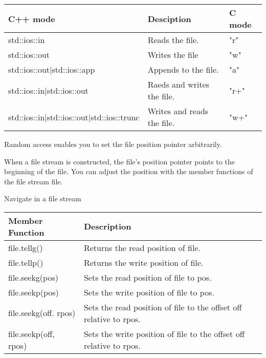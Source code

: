 \begin{longtable}[c]{|l|l|l|}
\hline
\textbf{C++ mode}                          & \textbf{Desciption}        & \textbf{C mode} \\ \hline
\endfirsthead
%
\endhead
%
std::ios::in                               & Reads the file.            & "r"             \\ \hline
std::ios::out                              & Writes the file            & "w"             \\ \hline
std::ios::out|std::ios::app                & Appends to the file.       & "a"             \\ \hline
std::ios::in|std::ios::out                 & Raeds and writes the file. & "r+"            \\ \hline
std::ios::in|std::ios::out|std::ios::trunc & Writes and reads the file. & "w+"            \\ \hline
\end{longtable}


Random access enables you to set the file position pointer arbitrarily.

When a file stream is constructed, the file’s position pointer points to the beginning of the file. You can adjust the position with the member functions of the file stream file.

\begin{center}
Navigate in a file stream
\end{center}

\begin{longtable}[c]{|l|l|}
\hline
\textbf{Member Function} & \textbf{Description}                    \\ \hline
\endfirsthead
%
\endhead
%
file.tellg()             & Returns the read position of file.      \\ \hline
file.tellp()             & Returns the write position of file.     \\ \hline
file.seekg(pos)          & Sets the read position of file to pos.  \\ \hline
file.seekp(pos)          & Sets the write position of file to pos. \\ \hline
file.seekg(off. rpos) & Sets the read position of file to the offset off relative to rpos.  \\ \hline
file.seekp(off, rpos) & Sets the write position of file to the offset off relative to rpos. \\ \hline
\end{longtable}

